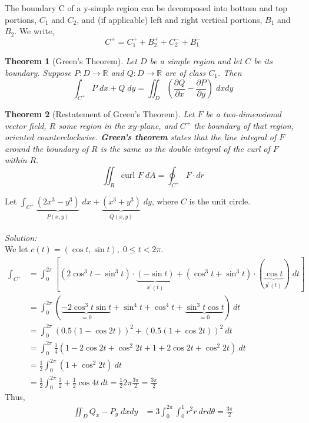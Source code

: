 \documentclass[12pt]{book}
\newtheorem{theorem}{Theorem}[section]
\theoremstyle{definition}
\theoremstyle{remark}
\newcommand\sol{%
  \\ 
  \\
  \textit{Solution:}\\%
}
\begin{document}
The boundary C of a y-simple region can be decomposed into bottom and top portions, $C_1$ and $C_2$, and (if applicable) left and right vertical portions, $B_1$ and $B_2$. We write, 
$$C^+ = C_1^+ + B_2^+ +  C_2^- + B_1^- $$
\begin{theorem}[Green's Theorem] \label{Green's Theorem}
    Let $D$ be a simple region and let $C$ be its boundary. Suppose $P: D \to \mathbb{R}$ and $Q: D \to \mathbb{R}$  are of class $C_1$. Then
    $$\int_{C^+} P \; dx + Q \; dy = \iint_D \left( \frac{\partial {Q}}{\partial {x}} -\frac{\partial {P}}{\partial {y}}  \right) \; dx dy $$
    
\end{theorem}
\begin{theorem}[Restatement of Green's Theorem]
  Let $F$ be a two-dimensional vector field, $R$ some region in the $xy$-plane, and $C^+$ the boundary of that region, oriented counterclockwise. \textbf{Green's theorem} states that the line integral of $F$ around the boundary of $R$ is the same as the double integral of the curl of $F$ within $R.$
  $$\iint_R \text{curl }F\; dA = \oint_{C^+} F \cdot {dr} $$
  
\end{theorem}
\begin{example}
  Let $\int_{C^+} \underbrace{(2 x^3- y^3)}_{P(x,y)} \; dx + \underbrace{(x^3 + y^3 )}_{Q(x,y)} \; dy $, where $C$ is the unit circle.  
 \sol 
  We let $c(t) = ( \cos t , \sin t) , \; 0 \leq t < 2 \pi$. 
  \begin{equation*}
    \begin{split}
      \int_{C^+} &= \int_0^{2 \pi} [(2 \cos^3 t -\sin^3 t )\cdot\underbrace{ (-\sin t)}_{x ^\prime (t)} + (\cos^3 t + \sin ^3 t )\cdot (\underbrace{\cos t}_{y ^\prime (t)}) \; dt ]\\ 
      &= \int_{{0}}^{{2\pi}} (\underbrace{-2 \cos^3 t \sin t}_{= 0} + \sin^4 t + \cos ^4 t + \underbrace{\sin^3 t \cos t}_{=0}) \: d{t} \\ 
      &= \int_{{0}}^{{2 \pi}} (0.5 (1-\cos 2t))^2 + (0.5(1+ \cos 2t))^2 \: dt \\
      &= \int_{{0}}^{{2\pi}} \frac{1}{4} (1 - 2\cos 2t + \cos^2 2t + 1 + 2\cos 2t + \cos ^2 2t) \: d{t} \\ 
      &= \frac{1}{2} \int_{{0}}^{{2\pi}} (1+ \cos^2 2t) \: d{t} \\ 
      &= \frac{1}{2} \int_{{0}}^{{2\pi}} \frac{3}{2}+ \frac{1}{2} \cos 4 t  \: d{t}  = \frac{1}{2} 2\pi \frac{3\pi}{2} = \frac{3\pi}{2} 
    \end{split}
  \end{equation*}
  Thus, 
  \begin{equation*}
    \begin{split}
      \iint_D Q_x - P_y \; dx dy &= 3 \int_{{0}}^{{2\pi}} \int_{{0}}^{{1}} r^2 r  \: d{r} d{\theta}  = \frac{3\pi}{2} 
    \end{split}
  \end{equation*}
\end{example}
\end{document}
